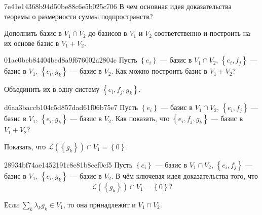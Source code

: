 \begin{note}{7e41e14368b94d50be88c6e5b025c706}
    В чем основная идея доказательства теоремы о размерности суммы подпространств?

    \begin{cloze}{1}
        Дополнить базис в \( V_1 \cap V_2 \) до базисов в \( V_1 \) и \( V_2 \) соответственно и построить на их основе базис в \( V_1 + V_2 \).
    \end{cloze}
\end{note}

\begin{note}{01ac0beb84404bed8a9f676002a2804c}
    Пусть
        \({ \left\{ e_i \right\} }\) --- базис в \({ V_1 \cap V_2 }\),\:
        \({ \left\{ e_i, f_j \right\} }\) --- базис в \({ V_1 }\),\:
        \({ \left\{ e_i, g_k \right\} }\) --- базис в \({ V_2 }\).
    Как можно построить базис в \( V_1 + V_2 \)?

    \begin{cloze}{1}
        Объединить их в одну систему \({ \left\{ e_i, f_j, g_k \right\} }\).
    \end{cloze}
\end{note}

\begin{note}{d6aa3baccb104c5d857dad61f06b75e7}
    Пусть
        \({ \left\{ e_i \right\} }\) --- базис в \({ V_1 \cap V_2 }\),\:
        \({ \left\{ e_i, f_j \right\} }\) --- базис в \({ V_1 }\),\:
        \({ \left\{ e_i, g_k \right\} }\) --- базис в \({ V_2 }\).
    Как показать, что \({ \left\{ e_i, f_j, g_k \right\} }\) --- базис в \({ V_1 + V_2 }\)?

    \begin{cloze}{1}
        Показать, что \( \mathscr L (\left\{ g_k \right\}) \cap V_1 = \left\{  0 \right\} \).
    \end{cloze}
\end{note}

\begin{note}{28934bf74ae1452191c8e81b8cef0cf5}
    Пусть
        \({ \left\{ e_i \right\} }\) --- базис в \({ V_1 \cap V_2 }\),\:
        \({ \left\{ e_i, f_j \right\} }\) --- базис в \({ V_1 }\),\:
        \({ \left\{ e_i, g_k \right\} }\) --- базис в \({ V_2 }\).
    В чём ключевая идея доказательства того, что
    \[
        \mathscr L (\left\{ g_k \right\}) \cap V_1 = \left\{  0 \right\}?
    \]

    \begin{cloze}{1}
        Если \({ \sum_{k}^{} \lambda_k g_k \in V_1 }\), то она принадлежит и \({ V_1 \cap V_2 }\).
    \end{cloze}
\end{note}

